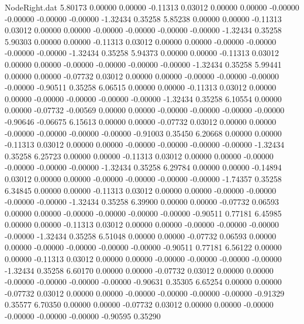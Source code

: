 \begin{filecontents}{NodeRight.dat}
   5.80173    0.00000    0.00000    -0.11313    0.03012    0.00000    0.00000   -0.00000   -0.00000   -0.00000   -0.00000   -1.32434    0.35258
   5.85238    0.00000    0.00000    -0.11313    0.03012    0.00000    0.00000   -0.00000   -0.00000   -0.00000   -0.00000   -1.32434    0.35258
   5.90303    0.00000    0.00000    -0.11313    0.03012    0.00000    0.00000   -0.00000   -0.00000   -0.00000   -0.00000   -1.32434    0.35258
   5.94373    0.00000    0.00000    -0.11313    0.03012    0.00000    0.00000   -0.00000   -0.00000   -0.00000   -0.00000   -1.32434    0.35258
   5.99441    0.00000    0.00000    -0.07732    0.03012    0.00000    0.00000   -0.00000   -0.00000   -0.00000   -0.00000   -0.90511    0.35258
   6.06515    0.00000    0.00000    -0.11313    0.03012    0.00000    0.00000   -0.00000   -0.00000   -0.00000   -0.00000   -1.32434    0.35258
   6.10554    0.00000    0.00000    -0.07732   -0.00569    0.00000    0.00000   -0.00000   -0.00000   -0.00000   -0.00000   -0.90646   -0.06675
   6.15613    0.00000    0.00000    -0.07732    0.03012    0.00000    0.00000   -0.00000   -0.00000   -0.00000   -0.00000   -0.91003    0.35450
   6.20668    0.00000    0.00000    -0.11313    0.03012    0.00000    0.00000   -0.00000   -0.00000   -0.00000   -0.00000   -1.32434    0.35258
   6.25723    0.00000    0.00000    -0.11313    0.03012    0.00000    0.00000   -0.00000   -0.00000   -0.00000   -0.00000   -1.32434    0.35258
   6.29784    0.00000    0.00000    -0.14894    0.03012    0.00000    0.00000   -0.00000   -0.00000   -0.00000   -0.00000   -1.74357    0.35258
   6.34845    0.00000    0.00000    -0.11313    0.03012    0.00000    0.00000   -0.00000   -0.00000   -0.00000   -0.00000   -1.32434    0.35258
   6.39900    0.00000    0.00000    -0.07732    0.06593    0.00000    0.00000   -0.00000   -0.00000   -0.00000   -0.00000   -0.90511    0.77181
   6.45985    0.00000    0.00000    -0.11313    0.03012    0.00000    0.00000   -0.00000   -0.00000   -0.00000   -0.00000   -1.32434    0.35258
   6.51048    0.00000    0.00000    -0.07732    0.06593    0.00000    0.00000   -0.00000   -0.00000   -0.00000   -0.00000   -0.90511    0.77181
   6.56122    0.00000    0.00000    -0.11313    0.03012    0.00000    0.00000   -0.00000   -0.00000   -0.00000   -0.00000   -1.32434    0.35258
   6.60170    0.00000    0.00000    -0.07732    0.03012    0.00000    0.00000   -0.00000   -0.00000   -0.00000   -0.00000   -0.90631    0.35305
   6.65254    0.00000    0.00000    -0.07732    0.03012    0.00000    0.00000   -0.00000   -0.00000   -0.00000   -0.00000   -0.91329    0.35577
   6.70350    0.00000    0.00000    -0.07732    0.03012    0.00000    0.00000   -0.00000   -0.00000   -0.00000   -0.00000   -0.90595    0.35290

\end{filecontents}
